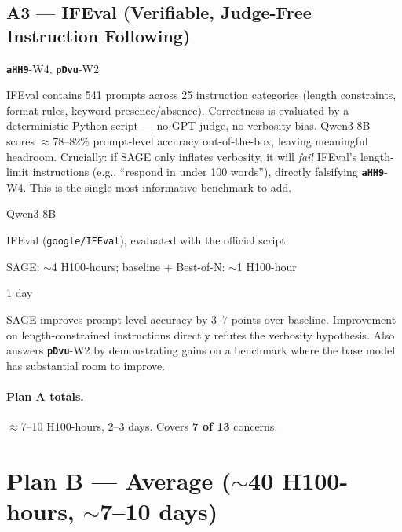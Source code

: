 \documentclass[11pt,a4paper]{article}
\newcommand{\rev}[1]{\texttt{\textbf{#1}}}
\begin{document}
\subsection*{A3 --- IFEval (Verifiable, Judge-Free Instruction Following)}

\begin{description}[leftmargin=2cm, style=nextline]
  \item[Covers] \rev{aHH9}-W4, \rev{pDvu}-W2
  \item[Rationale] IFEval contains 541 prompts across 25 instruction categories (length
    constraints, format rules, keyword presence/absence). Correctness is evaluated by a
    deterministic Python script --- no GPT judge, no verbosity bias. Qwen3-8B scores
    $\approx$78--82\% prompt-level accuracy out-of-the-box, leaving meaningful headroom.
    Crucially: if SAGE only inflates verbosity, it will \emph{fail} IFEval's
    length-limit instructions (e.g., ``respond in under 100 words''), directly falsifying
    \rev{aHH9}-W4. This is the single most informative benchmark to add.
  \item[Model] Qwen3-8B
  \item[Benchmark] IFEval (\texttt{google/IFEval}), evaluated with the official script
  \item[GPU estimate] SAGE: $\sim$4 H100-hours; baseline + Best-of-N: $\sim$1 H100-hour
  \item[Wall-clock] 1 day
  \item[Expected outcome] SAGE improves prompt-level accuracy by 3--7 points over baseline.
    Improvement on length-constrained instructions directly refutes the verbosity hypothesis.
    Also answers \rev{pDvu}-W2 by demonstrating gains on a benchmark where the base model
    has substantial room to improve.
\end{description}

\paragraph{Plan A totals.} $\approx$7--10 H100-hours, 2--3 days. Covers \textbf{7 of 13} concerns.

\section{Plan B --- Average ($\sim$40 H100-hours, $\sim$7--10 days)}
\end{document}
